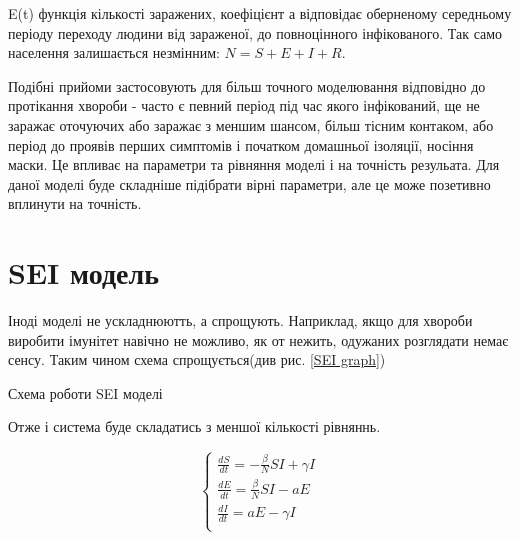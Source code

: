 E(t) функція кількості заражених, коефіцієнт а відповідає оберненому середньому періоду переходу людини від зараженої, до повноцінного інфікованого.
Так само населення залишається незмінним: $ N = S + E + I + R $.

Подібні прийоми застосовують для більш точного моделювання відповідно до
протікання хвороби - часто є певний період під час якого інфікований, 
ще не заражає оточуючих або заражає з меншим шансом, більш тісним контаком, 
або період до проявів перших симптомів і початком домашньої ізоляції,
носіння маски. 
Це впливає на параметри та рівняння моделі і на точність резульата. 
Для даної моделі буде складніше підібрати вірні параметри, 
але це може позетивно вплинути на точність. \cite{rahimi_review_2021}

\section{SEI модель}

Іноді моделі не ускладнюютть, а спрощують. 
Наприклад, якщо для хвороби виробити імунітет навічно не можливо, 
як от нежить, одужаних розглядати немає сенсу. 
Таким чином схема спрощується(див рис. \ref{SEI graph})

\begin{risunok}[ht]
    \centering
    \vspace{0.5cm}
    \caption{Схема роботи SEI моделі}
    \label{SEI graph}
\end{risunok}

Отже і система буде складатись з меншої кількості рівняннь.

\begin{equation*}
    \begin{cases}
        \frac{dS}{dt} = - \frac{\beta}{N}SI + \gamma I \\
        \frac{dE}{dt} = \frac{\beta}{N}SI - aE         \\
        \frac{dI}{dt} = aE - \gamma I                  \\
    \end{cases}
\end{equation*}

